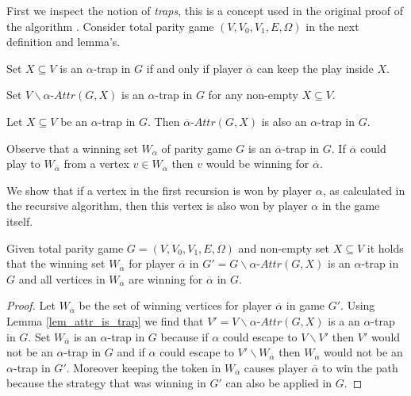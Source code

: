 First we inspect the notion of \textit{traps}, this is a concept used in the original proof of the algorithm \cite{ZIELONKA1998135}. Consider total parity game $(V,V_0,V_1,E,\Omega)$ in the next definition and lemma's.
\begin{definition}\cite{ZIELONKA1998135}
	Set $X \subseteq V$ is an $\alpha$-trap in $G$ if and only if player $\overline{\alpha}$ can keep the play inside $X$.
\end{definition}
\begin{lemma}\label{lem_attr_is_trap}
	\cite{ZIELONKA1998135}
	Set $V\backslash \alpha\textit{-Attr}(G,X)$ is an $\alpha$-trap in $G$ for any non-empty $X \subseteq V$.
\end{lemma}
\begin{lemma}
	\label{lem_attr_trap_is_trap}\cite{ZIELONKA1998135}
	Let $X \subseteq V$ be an $\alpha$-trap in $G$. Then $\overline{\alpha}\textit{-Attr}(G,X)$ is also an $\alpha$-trap in $G$.
\end{lemma}
Observe that a winning set $W_\alpha$ of parity game $G$ is an $\overline{\alpha}$-trap in $G$. If $\overline{\alpha}$ could play to $W_{\overline{\alpha}}$ from a vertex $v \in W_\alpha$ then $v$ would be winning for $\overline{\alpha}$.


We show that if a vertex in the first recursion is won by player $\alpha$, as calculated in the recursive algorithm, then this vertex is also won by player $\alpha$ in the game itself.
\begin{lemma}
	\label{lem_overlinealphawinner}
	Given total parity game $G = (V,V_0,V_1,E,\Omega)$ and non-empty set $X \subseteq V$ it holds that the winning set $W_{\overline{\alpha}}$ for player $\overline{\alpha}$ in  $G' = G \backslash \alpha\textit{-Attr}(G,X)$ is an $\alpha$-trap in $G$ and all vertices in $W_{\overline{\alpha}}$ are winning for $\overline{\alpha}$ in $G$.
	\begin{proof}
		Let $W_{\overline{\alpha}}$ be the set of winning vertices for player $\overline{\alpha}$ in game $G'$. Using Lemma \ref{lem_attr_is_trap} we find that $V' = V \backslash \alpha\textit{-Attr}(G,X)$ is a an $\alpha$-trap in $G$. Set $W_{\overline{\alpha}}$ is an $\alpha$-trap in $G$ because if $\alpha$ could escape to $V \backslash V'$ then $V'$ would not be an $\alpha$-trap in $G$ and if $\alpha$ could escape to $V' \backslash W_{\overline{\alpha}}$ then $W_{\overline{\alpha}}$ would not be an $\alpha$-trap in $G'$. Moreover keeping the token in $W_{\overline{\alpha}}$ causes player $\overline{\alpha}$ to win the path because the strategy that was winning in $G'$ can also be applied in $G$.
	\end{proof}
\end{lemma}

